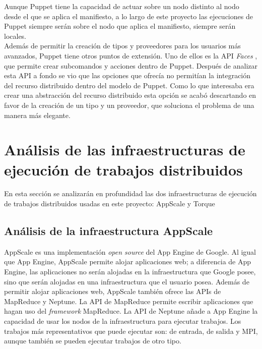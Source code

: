 Aunque Puppet tiene la capacidad de actuar sobre un nodo distinto al nodo desde el que se aplica el manifiesto, a lo largo de este proyecto las ejecuciones de Puppet siempre serán sobre el nodo que aplica el manifiesto, siempre serán locales. \\

Además de permitir la creación de tipos y proveedores para los usuarios más avanzados, Puppet tiene otros puntos de extensión. Uno de ellos es la API \emph{Faces} \cite{puppet-faces}, que permite crear subcomandos y acciones dentro de Puppet. Después de analizar esta API a fondo se vio que las opciones que ofrecía no permitían la integración del recurso distribuido dentro del modelo de Puppet. Como lo que interesaba era crear una abstracción del recurso distribuido esta opción se acabó descartando en favor de la creación de un tipo y un proveedor, que soluciona el problema de una manera más elegante.


\section{Análisis de las infraestructuras de ejecución de trabajos distribuidos}

En esta sección se analizarán en profundidad las dos infraestructuras de ejecución de trabajos distribuidos usadas en este proyecto: AppScale y Torque


\subsection{Análisis de la infraestructura AppScale}

AppScale es una implementación \emph{open source} del App Engine de Google. Al igual que App Engine, AppScale permite alojar aplicaciones web; a diferencia de App Engine, las aplicaciones no serán alojadas en la infraestructura que Google posee, sino que serán alojadas en una infraestructura que el usuario posea. Además de permitir alojar aplicaciones web, AppScale también ofrece las APIs de MapReduce y Neptune. La API de MapReduce permite escribir aplicaciones que hagan uso del \emph{framework} MapReduce. La API de Neptune añade a App Engine la capacidad de usar los nodos de la infraestructura para ejecutar trabajos. Los trabajos más representativos que puede ejecutar son: de entrada, de salida y MPI, aunque también se pueden ejecutar trabajos de otro tipo. \\

